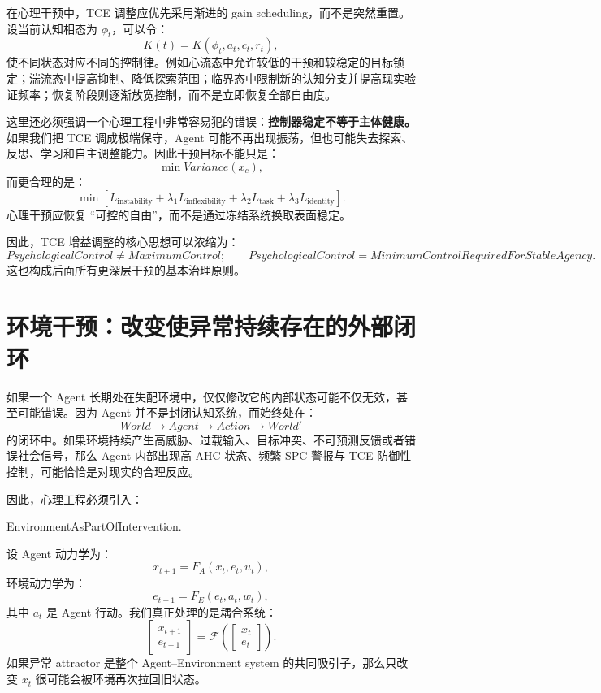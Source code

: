 在心理干预中，TCE 调整应优先采用渐进的 gain scheduling，而不是突然重置。设当前认知相态为 $\phi_t$，可以令：
\[
K(t)
=
K(\phi_t,a_t,c_t,r_t),
\]
使不同状态对应不同的控制律。例如心流态中允许较低的干预和较稳定的目标锁定；湍流态中提高抑制、降低探索范围；临界态中限制新的认知分支并提高现实验证频率；恢复阶段则逐渐放宽控制，而不是立即恢复全部自由度。

这里还必须强调一个心理工程中非常容易犯的错误：\textbf{控制器稳定不等于主体健康。} 如果我们把 TCE 调成极端保守，Agent 可能不再出现振荡，但也可能失去探索、反思、学习和自主调整能力。因此干预目标不能只是：
\[
\min Variance(x_c),
\]
而更合理的是：
\[
\min
\left[
L_{\mathrm{instability}}
+
\lambda_1 L_{\mathrm{inflexibility}}
+
\lambda_2 L_{\mathrm{task}}
+
\lambda_3 L_{\mathrm{identity}}
\right].
\]
心理干预应恢复 ``可控的自由''，而不是通过冻结系统换取表面稳定。

因此，TCE 增益调整的核心思想可以浓缩为：
\[
\boxed{
PsychologicalControl
\neq
MaximumControl;
\qquad
PsychologicalControl
=
MinimumControlRequiredForStableAgency.
}
\]
这也构成后面所有更深层干预的基本治理原则。

\section{环境干预：改变使异常持续存在的外部闭环}

如果一个 Agent 长期处在失配环境中，仅仅修改它的内部状态可能不仅无效，甚至可能错误。因为 Agent 并不是封闭认知系统，而始终处在：
\[
World
\rightarrow
Agent
\rightarrow
Action
\rightarrow
World'
\]
的闭环中。如果环境持续产生高威胁、过载输入、目标冲突、不可预测反馈或者错误社会信号，那么 Agent 内部出现高 AHC 状态、频繁 SPC 警报与 TCE 防御性控制，可能恰恰是对现实的合理反应。

因此，心理工程必须引入：
\begin{statementbox}
EnvironmentAsPartOfIntervention.
\end{statementbox}
设 Agent 动力学为：
\[
x_{t+1}
=
F_A(x_t,e_t,u_t),
\]
环境动力学为：
\[
e_{t+1}
=
F_E(e_t,a_t,w_t),
\]
其中 $a_t$ 是 Agent 行动。我们真正处理的是耦合系统：
\[
\begin{bmatrix}
x_{t+1}\\
e_{t+1}
\end{bmatrix}
=
\mathcal F
\left(
\begin{bmatrix}
x_t\\
e_t
\end{bmatrix}
\right).
\]
如果异常 attractor 是整个 Agent--Environment system 的共同吸引子，那么只改变 $x_t$ 很可能会被环境再次拉回旧状态。

